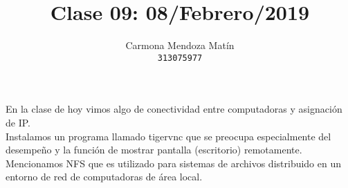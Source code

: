 \documentclass[11pt, a4paper]{report}
\begin{document}
\title{Clase 09: 08/Febrero/2019}
\author{
  Carmona Mendoza Mat\'in\\
  \texttt{313075977}
}
\date{}
\maketitle

En la clase de hoy vimos algo de conectividad entre computadoras y asignaci\'on de IP.\\

Instalamos un programa llamado tigervnc que se preocupa especialmente del desempeño y la función de mostrar pantalla (escritorio) remotamente.\\

Mencionamos NFS que es utilizado para sistemas de archivos distribuido en un entorno de red de computadoras de área local.
\end{document}
